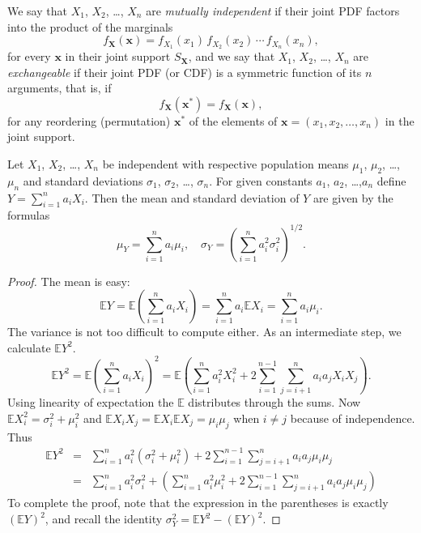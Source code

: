 We say that \(X_{1}\), \(X_{2}\), \ldots{}, \(X_{n}\) are \emph{mutually
independent} if their joint PDF factors into the product of the
marginals
\begin{equation}
f_{\mathbf{X}}(\mathbf{x})=f_{X_{1}}(x_{1})\, f_{X_{2}}(x_{2})\,\cdots\, f_{X_{n}}(x_{n}),
\end{equation}
for every \(\mathbf{x}\) in their joint support \(S_{\mathbf{X}}\),
and we say that \(X_{1}\), \(X_{2}\), \ldots{}, \(X_{n}\) are
\emph{exchangeable} if their joint PDF (or CDF) is a symmetric function of
its \(n\) arguments, that is, if
\begin{equation}
f_{\mathbf{X}}(\mathbf{x^{\ast}})=f_{\mathbf{X}}(\mathbf{x}),
\end{equation}
for any reordering (permutation) \(\mathbf{x^{\ast}}\) of the elements of \(\mathbf{x}=(x_{1},x_{2},\ldots,x_{n})\) in the joint support.

\begin{prop}
\label{pro-mean-sd-lin-comb} Let \(X_{1}\), \(X_{2}\), \ldots{}, \(X_{n}\) be
independent with respective population means \(\mu_{1}\), \(\mu_{2}\),
\ldots{}, \(\mu_{n}\) and standard deviations \(\sigma_{1}\),
\(\sigma_{2}\), \ldots{}, \(\sigma_{n}\). For given constants \(a_{1}\),
\(a_{2}\), \ldots{},\(a_{n}\) define \(Y=\sum_{i=1}^{n}a_{i}X_{i}\). Then
the mean and standard deviation of \(Y\) are given by the formulas
\begin{equation}
\mu_{Y}=\sum_{i=1}^{n}a_{i}\mu_{i},\quad \sigma_{Y}=\left(\sum_{i=1}^{n}a_{i}^{2}\sigma_{i}^{2}\right)^{1/2}.
\end{equation}
\end{prop}

\begin{proof}
The mean is easy: \[ \mathbb{E}
Y=\mathbb{E}\left(\sum_{i=1}^{n}a_{i}X_{i}\right)=\sum_{i=1}^{n}a_{i}\mathbb{E}
X_{i}=\sum_{i=1}^{n}a_{i}\mu_{i}.  \] The variance is not too
difficult to compute either. As an intermediate step, we calculate
\(\mathbb{E} Y^{2}\).  \[ \mathbb{E}
Y^{2}=\mathbb{E}\left(\sum_{i=1}^{n}a_{i}X_{i}\right)^{2}=\mathbb{E}\left(\sum_{i=1}^{n}a_{i}^{2}X_{i}^{2}+2\sum_{i=1}^{n-1}\sum_{j=i+1}^{n}a_{i}a_{j}X_{i}X_{j}\right).
\] Using linearity of expectation the \(\mathbb{E}\) distributes
through the sums. Now \(\mathbb{E}
X_{i}^{2}=\sigma_{i}^{2}+\mu_{i}^{2}\) and \(\mathbb{E}
X_{i}X_{j}=\mathbb{E} X_{i}\mathbb{E} X_{j}=\mu_{i}\mu_{j}\) when
\(i\neq j\) because of independence. Thus
\begin{eqnarray*}
\mathbb{E} Y^{2} & = & \sum_{i=1}^{n}a_{i}^{2}(\sigma_{i}^{2}+\mu_{i}^{2})+2\sum_{i=1}^{n-1}\sum_{j=i+1}^{n}a_{i}a_{j}\mu_{i}\mu_{j}\\
 & = & \sum_{i=1}^{n}a_{i}^{2}\sigma_{i}^{2}+\left(\sum_{i=1}^{n}a_{i}^{2}\mu_{i}^{2}+2\sum_{i=1}^{n-1}\sum_{j=i+1}^{n}a_{i}a_{j}\mu_{i}\mu_{j}\right)
\end{eqnarray*}
To complete the proof, note that the expression in the parentheses is
exactly \(\left(\mathbb{E} Y\right)^{2}\), and recall the identity
\(\sigma_{Y}^{2}=\mathbb{E} Y^{2}-\left(\mathbb{E} Y\right)^{2}\).
\end{proof}

